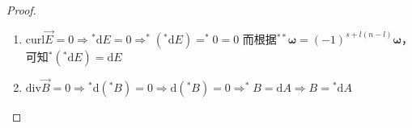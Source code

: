 \begin{enumerate}[（1）]
    \begin{proof}
        \begin{enumerate}[（1）]
            \item $\mathrm{curl}\vec E = 0 \Rightarrow \mathrm{^*d}E = 0  \Rightarrow ^*(\mathrm{^*d}E) = ^*0 = 0$
            而根据$^{**}\bm\omega = (-1)^{s + l(n - l)}\bm\omega$，可知$^*(\mathrm{^*d}E) = \mathrm{d}E$
            \item $\mathrm{div}\vec B = 0 \Rightarrow \mathrm{^*d}(^*B) = 0 \Rightarrow \mathrm{d}(^*B) = 0 \Rightarrow ^*B = \mathrm{d}A \Rightarrow B = \mathrm{^*d}A$
        \end{enumerate}
    \end{proof}
\end{enumerate}
